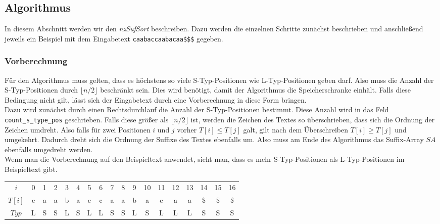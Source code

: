 \subsection{Algorithmus}

In diesem Abschnitt werden wir den \emph{nzSufSort} beschreiben. Dazu werden die einzelnen Schritte zunächst beschrieben und anschließend jeweils ein Beispiel mit dem Eingabetext \texttt{caabaccaabacaa\$\$\$} gegeben.

\subsubsection{Vorberechnung}

Für den Algorithmus muss gelten, dass es höchstens so viele S-Typ-Positionen wie L-Typ-Positionen geben darf. Also muss die Anzahl der S-Typ-Positionen durch $\lfloor n/2 \rfloor$ beschränkt sein. Dies wird benötigt, damit der Algorithmus die Speicherschranke einhält. Falls diese Bedingung nicht gilt, lässt sich der Eingabetext durch eine Vorberechnung in diese Form bringen. \\
Dazu wird zunächst durch einen Rechtsdurchlauf die Anzahl der S-Typ-Positionen bestimmt. Diese Anzahl wird in das Feld \texttt{count\_s\_type\_pos} geschrieben. Falls diese größer als $\lfloor n/2 \rfloor$ ist, werden die Zeichen des Textes so überschrieben, dass sich die Ordnung der Zeichen umdreht. Also falls für zwei Positionen $i$ und $j$ vorher $T[i] \le T[j]$ galt, gilt nach dem Überschreiben $T[i] \ge T[j]$ und umgekehrt. Dadurch dreht sich die Ordnung der Suffixe des Textes ebenfalls um. Also muss am Ende des Algorithmus das Suffix-Array $SA$ ebenfalls umgedreht werden. \\

Wenn man die Vorberechnung auf den Beispieltext anwendet, sieht man, dass es mehr S-Typ-Positionen als L-Typ-Positionen im Beispieltext gibt.

\begin{table}[H]
	\footnotesize
	\centering
	\begin{tabular}{c| c c c c c c c c c c c c c c c c c}
		$i$ & 0 & 1 & 2 & 3 & 4 & 5 & 6 & 7 & 8 & 9 & 10 & 11 & 12 & 13 & 14 & 15 & 16 \\
		$T[i]$ & c & a & a & b & a & c & c & a & a & b & a & c & a & a & \$ & \$ & \$ \\
		$Typ$ & L & S & S & L & S & L & L & S & S & L & S & L & L & L & S & S & S
	\end{tabular}
\end{table}

